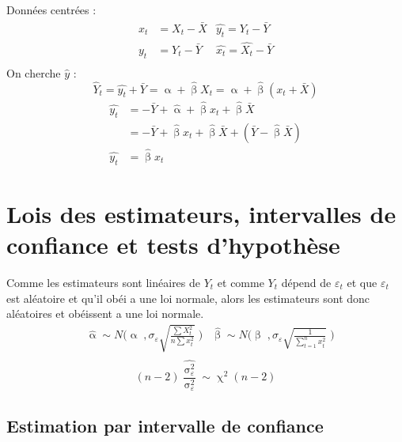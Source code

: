 \documentclass{article}
\newcommand{\hbeta}{\hat{\upbeta}}
\newcommand{\halpha}{\hat{\upalpha}}
\newcommand{\et}{\varepsilon_t}
\newcommand{\sumt}{\sum\limits_{t=1}^n}
\newcommand{\sig}{\upsigma_\varepsilon^2}
\begin{document}
Données centrées : 
\begin{align*}
	x_t &= X_t - \bar{X} &\hat{y_t} = \hat{Y_t} - \bar{Y}\\
	y_t &= Y_t - \bar{Y} &\hat{x_t} = \hat{X_t} - \bar{Y}\\
\end{align*}
On cherche \(\hat{y} \) :
\begin{equation*}
	\hat{Y}_t = \hat{y_t} + \bar{Y} = \hat{\upalpha} + \hat{\upbeta} X_t  = \hat{\upalpha} + \hat{\upbeta} (x_t + \bar{X})	
\end{equation*} 
\begin{align*}
	\hat{y_t} &= - \bar{Y} + \halpha + \hbeta x_t + \hbeta \bar{X} \\
	&= - \bar{Y} + \hbeta x_t + \hbeta \bar{X} + (\bar{Y} - \hbeta \bar{X}) \\
	\hat{y_t} &= \hbeta x_t
\end{align*}

\section{Lois des estimateurs, intervalles de confiance et tests d'hypothèse}
Comme les estimateurs sont linéaires de \(Y_t\) et comme \(Y_t\) dépend de \(\et\) et que \(\et\) est aléatoire et qu'il obéi a une loi normale, alors les estimateurs sont donc aléatoires et obéissent a une loi normale.
\begin{align*}
	& \halpha \sim N \Bigg(\upalpha \; , \sigma_\varepsilon \sqrt{\frac{\sum X^2_t}{n \sum x_t^2 }} \; \Bigg) &\hbeta \sim N \Bigg( \upbeta \; , \sigma_\varepsilon \sqrt{\frac{1}{\sumt x_t^2}} \; \Bigg) \\
\end{align*}
\[(n-2) \frac{\hat{\sig}}{\sig} \sim \upchi^2 (n-2)\]

\subsection{Estimation par intervalle de confiance}
\end{document}
